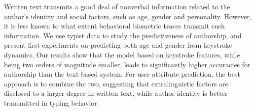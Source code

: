 Written text transmits a good deal of nonverbal information related to the author's identity and social factors, such as age, gender and personality. However, it is less known to what extent behavioral biometric traces transmit such information. We use typist data to study the predictiveness of authorship, and present first experiments on predicting both age and gender from keystroke dynamics. Our results show that the model based on keystroke features, while being two orders of magnitude smaller, leads to significantly higher accuracies for authorship than the text-based system. For user attribute prediction, the best approach is to combine the two, suggesting that extralinguistic factors are disclosed to a larger degree in written text, while author identity is better transmitted in typing behavior.
